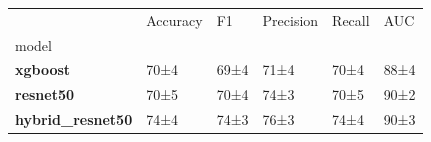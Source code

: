 \begin{tabular}{llllll}
\toprule
 & Accuracy & F1 & Precision & Recall & AUC \\
model &  &  &  &  &  \\
\midrule
\textbf{xgboost} & 70±4 & 69±4 & 71±4 & 70±4 & 88±4 \\
\textbf{resnet50} & 70±5 & 70±4 & 74±3 & 70±5 & 90±2 \\
\textbf{hybrid_resnet50} & 74±4 & 74±3 & 76±3 & 74±4 & 90±3 \\
\bottomrule
\end{tabular}
